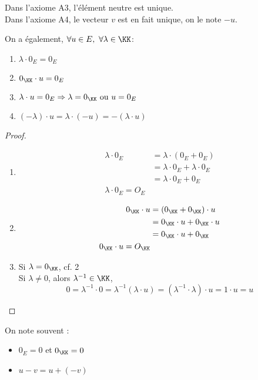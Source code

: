 \documentclass[../main.tex]{subfile}
\begin{document}
\begin{rema}
	Dans l'axiome A3, l'élément neutre est unique.\\
	Dans l'axiome A4, le vecteur $v$ est en fait unique, on le note $-u$.
\end{rema}

\begin{prop}
	On a également, $\forall u \in E, \ \forall \lambda \in \KK$:
\begin{enumerate}
	\item $\lambda \cdot 0_E = 0_E$
	\item $0_{\KK} \cdot u = 0_E$
	\item $\lambda \cdot u = 0_E \Rightarrow \lambda = 0_\KK \ \text{ou} \ u = 0_E$
	\item $(-\lambda) \cdot u = \lambda \cdot (-u) = - (\lambda \cdot u)$
\end{enumerate}
\end{prop}

\begin{proof}
\begin{enumerate}
	\item 
$$
\begin{aligned}
	\lambda \cdot 0_E &= \lambda \cdot (0_E + 0_E)\\
	&= \lambda \cdot 0_E + \lambda \cdot 0_E\\
	&= \lambda \cdot 0_E + 0_E\\
	\lambda \cdot 0_E = O_E
\end{aligned}
$$
	\item 
$$
\begin{aligned}
	0_\KK \cdot u &=   (0_\KK + 0_\KK) \cdot u\\
	&= 0_\KK \cdot u + 0_\KK \cdot u\\
	&= 0_\KK \cdot u + 0_\KK\\
	0_\KK \cdot u = O_\KK
\end{aligned}
$$
	\item Si $\lambda = 0_\KK$, cf. 2\\
	Si $\lambda \neq 0$, alors $\lambda^{-1} \in \KK$,\\
$$0 = \lambda^{-1} \cdot 0 = \lambda^{-1} (\lambda \cdot u) = (\lambda^{-1} \cdot \lambda) \cdot u = 1 \cdot u = u$$
\end{enumerate}
\end{proof}

\begin{nota}
	On note souvent :
\begin{itemize}
	\item $0_E = 0$ et $0_\KK = 0$
	\item $u - v = u + (-v)$
\end{itemize}
\end{nota}
\end{document}
